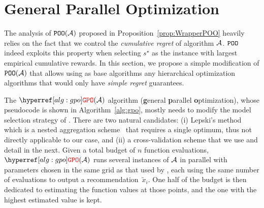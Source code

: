 \section{General Parallel Optimization}\label{sec:gpo.gpo}

The analysis of $\texttt{POO}(\mathcal{A})$ proposed in Proposition~\ref{prop:WrapperPOO} heavily relies on the fact that we control the \emph{cumulative regret} of algorithm $\mathcal{A}$. $\texttt{POO}$ indeed exploits this property when selecting $s^\star$ as the instance with largest empirical cumulative rewards. In this section, we propose a simple modification of $\texttt{POO}(\mathcal{A})$ that allows using as base algorithms any hierarchical optimization algorithms that would only have \emph{simple regret} guarantees. 

The $\GPO(\cA)$ algorithm (\textbf{g}eneral \textbf{p}arallel \textbf{o}ptimization), whose pseudocode is shown in Algorithm~\ref{alg:gpo},  mostly needs to modify the model selection strategy of \POO. There are two natural candidates: (i) Lepski's method which is a nested aggregation scheme~\citep{lepski1992,lepski1997,locatelli2017adaptivity,locatelli2018adaptivity} that requires a single optimum, thus not directly applicable to our case, and (ii) a cross-validation scheme that we use and detail in the next. Given a total budget of $n$ function evaluations, $\GPO(\cA)$ runs several instances of $\mathcal{A}$ in parallel with parameters chosen in the same grid as that used by \POO, each using the same number of evaluations to output a recommendation~$\tilde{x}_i$. One half of the budget is then dedicated to estimating the function values at those points, and the one with the highest estimated value is kept. 

